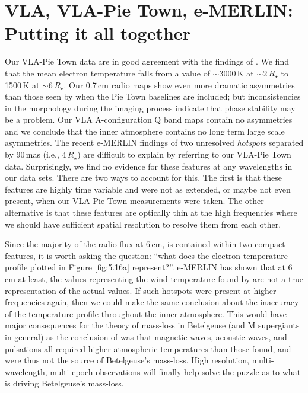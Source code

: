 \section{VLA, VLA-Pie Town, e-MERLIN: Putting it all together}\label{sec:5.15}
Our VLA-Pie Town data are in good agreement with the findings of \cite{lim_1998}. We find that the mean electron temperature falls from a value of $\sim 3000$\,K at $\sim 2\,R_{\star}$ to 1500\,K at $\sim 6\,R_{\star}$. Our 0.7\,cm radio maps show even more dramatic asymmetries than those seen by \cite{lim_1998} when the Pie Town baselines are included; but inconsistencies in the morphology during the imaging process indicate that phase stability may be a problem. Our VLA A-configuration Q band maps contain no asymmetries and we conclude that the inner atmosphere contains no long term large scale asymmetries. The recent e-MERLIN findings of two unresolved \textit{hotspots} separated by 90\,mas (i.e., $4\,R_{\star}$) are difficult to explain by referring to our VLA-Pie Town data. Surprisingly, we find no evidence for these features at any wavelengths in our data sets. There are two ways to account for this. The first is that these features are highly time variable and were not as extended, or maybe not even present, when our VLA-Pie Town measurements were taken. The other alternative is that these features are optically thin at the high frequencies where we should have sufficient spatial resolution to resolve them from each other. 

Since the majority of the radio flux at 6\,cm, is contained within two compact features, it is worth asking the question: ``what does the electron temperature profile plotted in Figure \ref{fig:5.16a} represent?''. e-MERLIN  has shown that at 6\,cm at least, the values representing the wind temperature found by \cite{lim_1998} are not a true representation of the actual values. If such hotspots were present at higher frequencies again, then we could make the same conclusion about the inaccuracy of the temperature profile throughout the inner atmosphere. This would have major consequences for the theory of mass-loss in Betelgeuse (and M supergiants in general) as the conclusion of \cite{lim_1998} was that magnetic waves, acoustic waves, and pulsations all required higher atmospheric temperatures than those found, and were thus not the source of Betelgeuse's mass-loss. High resolution, multi-wavelength, multi-epoch observations will finally help solve the puzzle as to what is driving Betelgeuse's mass-loss.


